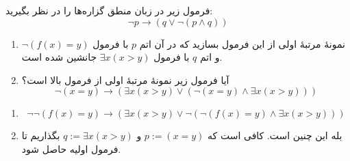 
	فرمول زیر در زبان منطق گزاره‌ها را در نظر بگیرید:
	\[\neg p \rightarrow (q \vee \neg(p \wedge q))\]
	\begin{enumerate}[label=(\alph*)]
		\item نمونه‌ٔ مرتبهٔ اولی از این فرمول بسازید که در آن اتم $p$ با فرمول $\neg(f(x)=y)$ و اتم $q$ با فرمول $\exists x (x > y)$ جانشین شده است.
		\item آیا فرمول زیر نمونهٔ مرتبهٔ اولی از فرمول بالا است؟
		\[ \neg(x = y) \rightarrow (\exists x (x > y) \vee (\neg(x = y) \wedge \exists x (x > y))) \]
	\end{enumerate}
	
	\quad\vspace{0.5cm}
	\begin{ans}
		\begin{enumerate}
		\item
			$$
			\neg \neg(f(x) = y) \rightarrow (\exists x (x > y) \vee \neg(\neg(f(x) = y) \wedge \exists x (x > y)))
			$$
		\item 
		بله این چنین است. کافی است که
		$
			p := (x = y)
		$
		و
		$
			q := \exists x (x > y)
		$
		بگذاریم تا فرمول اولیه حاصل شود.
		\end{enumerate}
	\end{ans}

